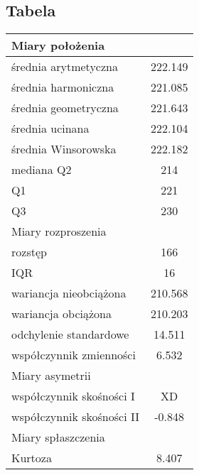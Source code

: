 \documentclass{article}
\theoremstyle{break}
\begin{document}
\subsection{Tabela}
\begin{longtable}[c]{| c | c |}
\hline
\multicolumn{2}{|l|}{\cellcolor[HTML]{DBDBDB}Miary położenia}    \\ \hline
\multicolumn{1}{|l|}{średnia arytmetyczna}          & 222.149    \\ \hline
\multicolumn{1}{|l|}{średnia harmoniczna}           & 221.085    \\ \hline
\multicolumn{1}{|l|}{średnia geometryczna}          & 221.643    \\ \hline
\multicolumn{1}{|l|}{średnia ucinana}               & 222.104    \\ \hline
\multicolumn{1}{|l|}{średnia Winsorowska}           & 222.182    \\ \hline
\multicolumn{1}{|l|}{mediana Q2}                    & 214        \\ \hline
\multicolumn{1}{|l|}{Q1}                            & 221        \\ \hline
\multicolumn{1}{|l|}{Q3}                            & 230        \\ \hline
\multicolumn{2}{|l|}{\cellcolor[HTML]{DBDBDB}Miary rozproszenia} \\ \hline
\multicolumn{1}{|l|}{rozstęp}                       & 166        \\ \hline
\multicolumn{1}{|l|}{IQR}                           & 16         \\ \hline
\multicolumn{1}{|l|}{wariancja nieobciążona}        & 210.568    \\ \hline
\multicolumn{1}{|l|}{wariancja obciążona}           & 210.203    \\ \hline
\multicolumn{1}{|l|}{odchylenie standardowe}        & 14.511     \\ \hline
\multicolumn{1}{|l|}{współczynnik zmienności}       & 6.532      \\ \hline
\multicolumn{2}{|l|}{\cellcolor[HTML]{DBDBDB}Miary asymetrii}    \\ \hline
\multicolumn{1}{|l|}{współczynnik skośności I}      & XD          \\ \hline
\multicolumn{1}{|l|}{współczynnik skośności II}     & -0.848     \\ \hline
\multicolumn{2}{|l|}{\cellcolor[HTML]{DBDBDB}Miary spłaszczenia} \\ \hline
\multicolumn{1}{|l|}{Kurtoza}                       & 8.407      \\ \hline
\end{longtable}
\end{document}
